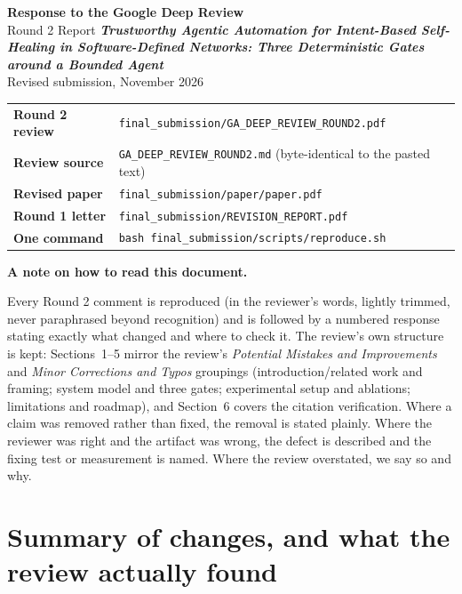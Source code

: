 \documentclass[11pt,a4paper]{article}
\begin{document}
\begin{titlepage}
\vspace*{2.8cm}
{\color{ink}\Huge\bfseries Response to the Google Deep Review\\[0.3em]\bigskip}
{\color{ink}\Large Round 2 Report\bigskip}
{\color{ink}\large\bfseries
\emph{Trustworthy Agentic Automation for Intent-Based Self-Healing in
Software-Defined Networks: Three Deterministic Gates around a Bounded Agent}\\[0.6em]}
{\large Revised submission, November 2026}

\vspace{1.2cm}
{\small
\begin{tabular}{@{}ll@{}}
\toprule
\textbf{Round 2 review} & \texttt{final\_submission/GA\_DEEP\_REVIEW\_ROUND2.pdf} \\
\textbf{Review source} & \texttt{GA\_DEEP\_REVIEW\_ROUND2.md} (byte-identical to the pasted text) \\
\textbf{Revised paper} & \texttt{final\_submission/paper/paper.pdf} \\
\textbf{Round 1 letter} & \texttt{final\_submission/REVISION\_REPORT.pdf} \\
\textbf{One command} & \texttt{bash final\_submission/scripts/reproduce.sh} \\
\bottomrule
\end{tabular}
}

\vspace{1.5cm}
\noindent\textbf{A note on how to read this document.}

Every Round 2 comment is reproduced (in the reviewer's words, lightly
trimmed, never paraphrased beyond recognition) and is followed by a
numbered response stating exactly what changed and where to check it. The
review's own structure is kept: Sections~1–5 mirror the review's
\emph{Potential Mistakes and Improvements} and \emph{Minor Corrections and
Typos} groupings (introduction/related work and framing; system model and
three gates; experimental setup and ablations; limitations and roadmap), and
Section~6 covers the citation verification. Where a claim was removed
rather than fixed, the removal is stated plainly. Where the reviewer was
right and the artifact was wrong, the defect is described and the fixing
test or measurement is named. Where the review overstated, we say so and
why.

\vfill
\end{titlepage}

\section{Summary of changes, and what the review actually found}
\end{document}
